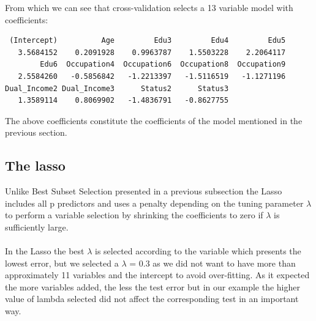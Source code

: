 \documentclass{article}
\begin{document}
\noindent From which we can see that cross-validation selects a 13 variable model with coefficients:
{\small
\begin{verbatim}
 (Intercept)          Age         Edu3         Edu4         Edu5 
   3.5684152    0.2091928    0.9963787    1.5503228    2.2064117 
        Edu6  Occupation4  Occupation6  Occupation8  Occupation9 
   2.5584260   -0.5856842   -1.2213397   -1.5116519   -1.1271196 
Dual_Income2 Dual_Income3      Status2      Status3 
   1.3589114    0.8069902   -1.4836791   -0.8627755 
 \end{verbatim}
 }
\noindent The above coefficients constitute the coefficients of the model mentioned in the previous section.

\subsection{The lasso}
Unlike Best Subset Selection presented in a previous subsection the Lasso includes all p predictors and uses a penalty depending on the tuning parameter $\lambda$ to perform a variable selection by shrinking the coefficients to zero if $\lambda$ is sufficiently large.
\\\\
In the Lasso the best $\lambda$ is selected according to the variable which presents the lowest error, but we selected a $\lambda$ = 0.3 as we did not want to have more than approximately 11 variables and the intercept to avoid over-fitting. As it expected the more variables added, the less the test error but in our example the higher value of lambda selected did not affect the corresponding test in an important way.
\end{document}
